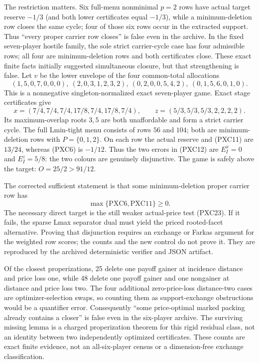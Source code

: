 \documentclass[11pt]{article}
\begin{document}
The restriction matters.  Six full-menu nonminimal $p=2$ rows have actual target
reserve $-1/3$ (and both lower certificates equal $-1/3$), while a
minimum-deletion row closes the same cycle; four of those six rows occur in
the extracted support.  Thus ``every proper carrier row
closes'' is false even in the archive.  In the fixed seven-player hostile
family, the sole strict carrier-cycle case has four admissible rows; all four
are minimum-deletion rows and both certificates close.  These exact finite
facts initially suggested simultaneous closure, but that strengthening is
false.  Let $v$ be the lower envelope of the four common-total allocations
\[
 (1,5,0,7,0,0,0),\ (2,0,3,1,2,3,2),\
 (0,2,0,0,5,4,2),\ (0,1,5,6,0,1,0).
\]
This is a nonnegative singleton-normalized exact seven-player game.  Exact
stage certificates give
\[
 x=(7/4,7/4,7/4,17/8,7/4,17/8,7/4),\qquad
 z=(5/3,5/3,5/3,2,2,2,2).
\]
Its maximum-overlap roots $3,5$ are both unaffordable and form a strict
carrier cycle.  The full Lmin-tight menu consists of rows $56$ and $104$;
both are minimum-deletion rows with $P=\{0,1,2\}$.  On each row the actual
reserve and (PXC11) are $13/24$, whereas (PXC6) is $-1/12$.  Thus the two
errors in (PXC12) are $E_I^x=0$ and $E_I^z=5/8$: the two colours are
genuinely disjunctive.  The game is safely above the target:
$O=25/2>91/12$.

The corrected sufficient statement is that some minimum-deletion proper
carrier row has
\[
 \max\{\mathrm{PXC6},\mathrm{PXC11}\}\ge0.
\]
The necessary direct target is the still weaker actual-price test (PXC23).
If it fails, the sparse Lmax separator dual must yield the priced rooted-facet
alternative.  Proving that disjunction requires an exchange or Farkas
argument for the weighted row scores; the counts and the new control do not
prove it.  They are reproduced by
the archived deterministic verifier and JSON artifact.

Of the closest properizations, 25 delete
one payoff gainer at incidence distance and price loss one, while 48 delete
one payoff gainer and one nongainer at distance and price loss two.  The four
additional zero-price-loss distance-two cases are optimizer-selection swaps, so counting
them as support-exchange obstructions would be a quantifier error.
Consequently ``some price-optimal marked packing already contains a closer''
is false even in the six-player archive.  The surviving missing lemma is a
charged properization theorem for this rigid residual class, not an identity
between two independently optimized certificates.  These counts are exact
finite evidence, not an all-six-player census or a dimension-free exchange
classification.
\end{document}
